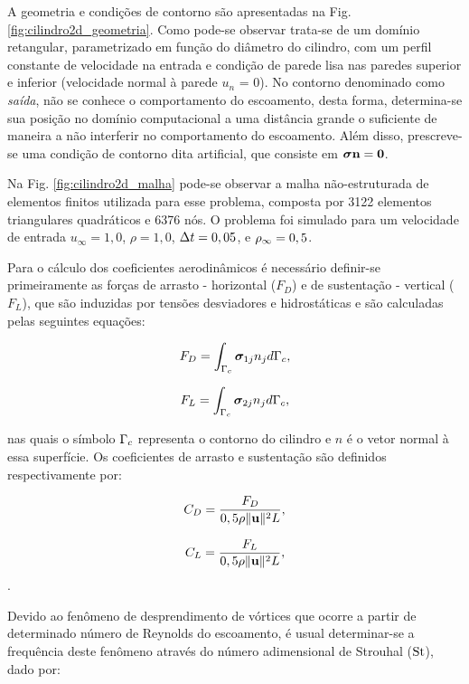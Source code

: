 \documentclass[tese_patricia]{subfiles}%
\begin{document}
A geometria e condições de contorno são apresentadas na Fig. \ref{fig:cilindro2d_geometria}. Como pode-se observar trata-se de um domínio retangular, parametrizado em função do diâmetro do cilindro, com um perfil constante de velocidade na entrada e condição de parede lisa nas paredes superior e inferior (velocidade normal à parede $u_{n}$ = 0). No contorno denominado como \textit{saída}, não se conhece o comportamento do escoamento, desta forma, determina-se sua posição no domínio computacional a uma distância grande o suficiente de maneira a não interferir no comportamento do escoamento. Além disso, prescreve-se uma condição de contorno dita artificial, que consiste em $\boldsymbol{\sigma} \mathbf{n} = \mathbf{0}$.

Na Fig. \ref{fig:cilindro2d_malha} pode-se observar a malha não-estruturada de elementos finitos utilizada para esse problema, composta por 3122 elementos triangulares quadráticos e 6376 nós. O problema foi simulado para um velocidade de entrada $u_{\infty} = 1,0$, $\rho = 1,0$, $\Delta t = 0,05$, e $\rho_\infty = 0,5$. 

Para o cálculo dos coeficientes aerodinâmicos é necessário definir-se primeiramente as forças de arrasto - horizontal ($F_D$) e de sustentação - vertical ($F_L$), que são induzidas por tensões desviadores e hidrostáticas e são calculadas pelas seguintes equações:

\begin{align}
F_D = \int_{\Gamma_{c}} \boldsymbol{\sigma}_{1j}n_{j} d\Gamma_{c},
\end{align}

\begin{align}
F_L = \int_{\Gamma_{c}} \boldsymbol{\sigma}_{2j}n_{j} d\Gamma_{c},
\end{align}

\noindent nas quais o símbolo $\Gamma_{c}$ representa o contorno do cilindro e $n$ é o vetor normal à essa superfície. Os coeficientes de arrasto e sustentação são definidos respectivamente por:

\begin{align}
	C_D = \frac{F_D}{0,5\rho \lVert \mathbf{u} \lVert^{2} L},
\end{align}

\begin{align}
	C_L = \frac{F_L}{0,5\rho \lVert \mathbf{u} \lVert^{2} L},
\end{align}.

Devido ao fenômeno de desprendimento de vórtices que ocorre a partir de determinado número de Reynolds do escoamento, é usual determinar-se a frequência deste fenômeno através do número adimensional de Strouhal ($\mathrm{St}$), dado por:
\end{document}
